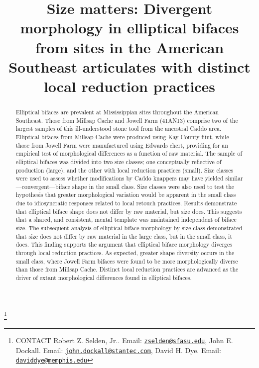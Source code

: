 \documentclass[]{interact}
\theoremstyle{plain}%
\theoremstyle{definition}
\theoremstyle{remark}
\begin{document}

\title{Size matters: Divergent morphology in elliptical bifaces from
sites in the American Southeast articulates with distinct local
reduction practices}


\author{
}

\thanks{CONTACT Robert Z. Selden,
Jr.. Email: \href{mailto:zselden@sfasu.edu}{\nolinkurl{zselden@sfasu.edu}}, John
E.
Dockall. Email: \href{mailto:john.dockall@stantec.com}{\nolinkurl{john.dockall@stantec.com}}, David
H.
Dye. Email: \href{mailto:daviddye@memphis.edu}{\nolinkurl{daviddye@memphis.edu}}}

\maketitle

\begin{abstract}
Elliptical bifaces are prevalent at Mississippian sites throughout the
American Southeast. Those from Millsap Cache and Jowell Farm (41AN13)
comprise two of the largest samples of this ill-understood stone tool
from the ancestral Caddo area. Elliptical bifaces from Millsap Cache
were produced using Kay County flint, while those from Jowell Farm were
manufactured using Edwards chert, providing for an empirical test of
morphological differences as a function of raw material. The sample of
elliptical bifaces was divided into two size classes; one conceptually
reflective of production (large), and the other with local reduction
practices (small). Size classes were used to assess whether
modifications by Caddo knappers may have yielded
similar---convergent---biface shape in the small class. Size classes
were also used to test the hypothesis that greater morphological
variation would be apparent in the small class due to idiosyncratic
responses related to local retouch practices. Results demonstrate that
elliptical biface shape does not differ by raw material, but size does.
This suggests that a shared, and consistent, mental template was
maintained independent of biface size. The subsequent analysis of
elliptical biface morphology by size class demonstrated that size does
not differ by raw material in the large class, but in the small class,
it does. This finding supports the argument that elliptical biface
morphology diverges through local reduction practices. As expected,
greater shape diversity occurs in the small class, where Jowell Farm
bifaces were found to be more morphologically diverse than those from
Millsap Cache. Distinct local reduction practices are advanced as the
driver of extant morphological differences found in elliptical bifaces.
\end{abstract}
\end{document}
